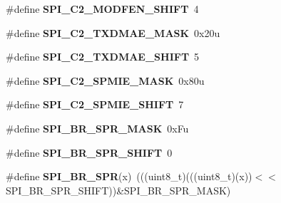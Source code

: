 \begin{DoxyCompactItemize}
\item 
\mbox{\label{group___s_p_i___register___masks_ga7e2e1a75667ba2896d6056f5f886dec5}} 
\#define {\bfseries S\+P\+I\+\_\+\+C2\+\_\+\+M\+O\+D\+F\+E\+N\+\_\+\+S\+H\+I\+FT}~4
\item 
\mbox{\label{group___s_p_i___register___masks_ga847c4ae3f2f0aed59df609ca39afb483}} 
\#define {\bfseries S\+P\+I\+\_\+\+C2\+\_\+\+T\+X\+D\+M\+A\+E\+\_\+\+M\+A\+SK}~0x20u
\item 
\mbox{\label{group___s_p_i___register___masks_gaf1162ea05678ca446ca23d5e7ae0bc1f}} 
\#define {\bfseries S\+P\+I\+\_\+\+C2\+\_\+\+T\+X\+D\+M\+A\+E\+\_\+\+S\+H\+I\+FT}~5
\item 
\mbox{\label{group___s_p_i___register___masks_ga734ac5ba36a5402f92dd9ecf15a7a87b}} 
\#define {\bfseries S\+P\+I\+\_\+\+C2\+\_\+\+S\+P\+M\+I\+E\+\_\+\+M\+A\+SK}~0x80u
\item 
\mbox{\label{group___s_p_i___register___masks_ga33a757ba520cab426978fbfc57957b5b}} 
\#define {\bfseries S\+P\+I\+\_\+\+C2\+\_\+\+S\+P\+M\+I\+E\+\_\+\+S\+H\+I\+FT}~7
\item 
\mbox{\label{group___s_p_i___register___masks_gaac7263560f1cc81f8f3fb6a7089d5c26}} 
\#define {\bfseries S\+P\+I\+\_\+\+B\+R\+\_\+\+S\+P\+R\+\_\+\+M\+A\+SK}~0x\+Fu
\item 
\mbox{\label{group___s_p_i___register___masks_ga49ebd0e5e9751438bc3968877baf2661}} 
\#define {\bfseries S\+P\+I\+\_\+\+B\+R\+\_\+\+S\+P\+R\+\_\+\+S\+H\+I\+FT}~0
\item 
\mbox{\label{group___s_p_i___register___masks_ga3fc6dbcc300be115c0e5d1dbc99946a2}} 
\#define {\bfseries S\+P\+I\+\_\+\+B\+R\+\_\+\+S\+PR}(x)~(((uint8\+\_\+t)(((uint8\+\_\+t)(x))$<$$<$S\+P\+I\+\_\+\+B\+R\+\_\+\+S\+P\+R\+\_\+\+S\+H\+I\+FT))\&S\+P\+I\+\_\+\+B\+R\+\_\+\+S\+P\+R\+\_\+\+M\+A\+SK)
\item 
\mbox{\label{group___s_p_i___register___masks_gaf3ca4981d609aac2f31d89c677192f7a}} 
$$
\end{DoxyCompactItemize}
